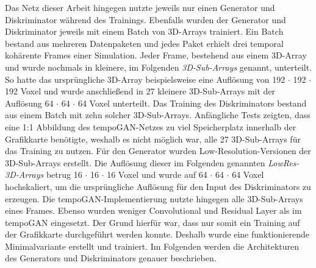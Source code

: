 Das Netz dieser Arbeit hingegen nutzte jeweils nur einen Generator und Diskriminator während des Trainings. Ebenfalls wurden der Generator und Diskriminator jeweils mit einem Batch von 3D-Arrays trainiert. Ein Batch bestand aus mehreren Datenpaketen und jedes Paket erhielt drei temporal kohärente Frames einer Simulation. Jeder Frame, bestehend aus einem 3D-Array und wurde nochmals in kleinere, im Folgenden \textit{3D-Sub-Arrays} genannt, unterteilt. So hatte das ursprüngliche 3D-Array beispielsweise eine Auflösung von 192 $\cdot$ 192 $\cdot$ 192 Voxel und wurde anschließend in 27 kleinere 3D-Sub-Arrays mit der Auflösung 64 $\cdot$ 64 $\cdot$ 64 Voxel unterteilt. Das Training des Diskriminators bestand aus einem Batch mit zehn solcher 3D-Sub-Arrays. Anfängliche Tests zeigten, dass eine 1:1 Abbildung des tempoGAN-Netzes zu viel Speicherplatz innerhalb der Grafikkarte benötigte, weshalb es nicht möglich war, alle 27 3D-Sub-Arrays für das Training zu nutzen. Für den Generator wurden Low-Resolution-Versionen der 3D-Sub-Arrays erstellt. Die Auflösung dieser im Folgenden genannten \textit{LowRes-3D-Arrays} betrug 16 $\cdot$ 16 $\cdot$ 16 Voxel und wurde auf 64 $\cdot$ 64 $\cdot$ 64 Voxel hochskaliert, um die ursprüngliche Auflösung für den Input des Diskriminators zu erzeugen. Die tempoGAN-Implementierung nutzte hingegen alle 3D-Sub-Arrays eines Frames. Ebenso wurden weniger Convolutional und Residual Layer als im tempoGAN eingesetzt. Der Grund hierfür war, dass nur somit ein Training auf der Grafikkarte durchgeführt werden konnte. Deshalb wurde eine funktionierende Minimalvariante erstellt und trainiert. Im Folgenden werden die Architekturen des Generators und Diskriminators genauer beschrieben.

